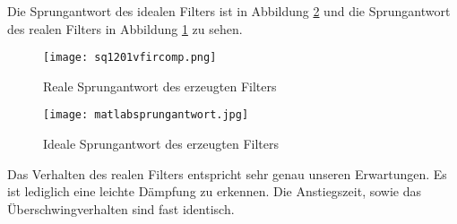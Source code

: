 Die Sprungantwort des idealen Filters ist in Abbildung \ref{fig:MatlabSprung} und die Sprungantwort des realen Filters in Abbildung \ref{fig:DSPSprung} zu sehen.
\begin{figure}[H]
  \centering
    \texttt{[image: sq1201vfircomp.png]}
  \caption{Reale Sprungantwort des erzeugten Filters}
  \label{fig:DSPSprung}
\end{figure}
\begin{figure}[H]
  \centering
    \texttt{[image: matlabsprungantwort.jpg]}
  \caption{Ideale Sprungantwort des erzeugten Filters}
  \label{fig:MatlabSprung}
\end{figure}
Das Verhalten des realen Filters entspricht sehr genau unseren Erwartungen. Es ist lediglich eine leichte D\"ampfung zu erkennen.
Die Anstiegszeit, sowie das Überschwingverhalten sind fast identisch.